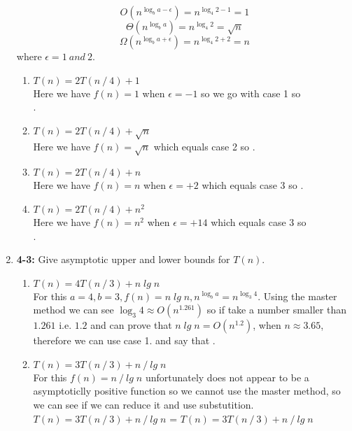 \documentclass{article}
\begin{document}
\begin{enumerate}
    \[O(n^{\log_b a-\epsilon}) = n^{\log_4 2-1} = 1\]
    \[\Theta(n^{\log_b a}) = n^{\log_4 2} = \sqrt{n}\] 
    \[\Omega(n^{\log_b a+\epsilon}) = n^{\log_4 2+2} = n\]
    where $\epsilon = 1\:and\:2$.
    \begin{enumerate}
      \itemsep1em 
      \item $T(n) = 2T(n \mathbin{/} 4) + 1$ \\
      Here we have $f(n) = 1$ when $\epsilon = -1$ so we go with case 1 so \\ .
      \item $T(n) = 2T(n \mathbin{/} 4) + \sqrt{n}$ \\
      Here we have $f(n) = \sqrt{n}$ which equals case 2 so .
      \item $T(n) = 2T(n \mathbin{/} 4) + n$ \\
      Here we have $f(n) = n$ when $\epsilon = +2$ which equals case 3 so . 
      \item $T(n) = 2T(n \mathbin{/} 4) + n^2$ \\
      Here we have $f(n) = n^2$ when $\epsilon = +14$ which equals case 3 so \\ .
    \end{enumerate}

    \item \textbf{4-3:} Give asymptotic upper and lower bounds for $T(n)$.
    \begin{enumerate}
      \itemsep1em 
      \item $T(n) = 4T(n \mathbin{/} 3) + n\;lg\;n$ \\
      For this $a = 4, b = 3, f(n) = n\;lg\;n, n^{\log_b a} = n^{\log_3 4}$. Using the master method we can see $\log_3 4 \approx O(n^{1.261})$ 
      so if take a number smaller than $1.261$ i.e. $1.2$ and can prove that $n\;lg\;n = O(n^{1.2})$, when $n \approx 3.65$, therefore we can use case 1.
      and say that .

      \item $T(n) = 3T(n \mathbin{/} 3) + n \mathbin{/} lg\;n$ \\
      For this $f(n) = n \mathbin{/} lg\;n$ unfortunately does not appear to be a asymptoticlly positive function so we cannot use the master method, so we can see if we can reduce it and use substutition.
      $T(n) = 3T(n \mathbin{/} 3) + n \mathbin{/} lg\;n$ = $T(n) = 3T(n \mathbin{/} 3) + n \mathbin{/} lg\;n$


\end{enumerate}
\end{enumerate}
\end{document}
